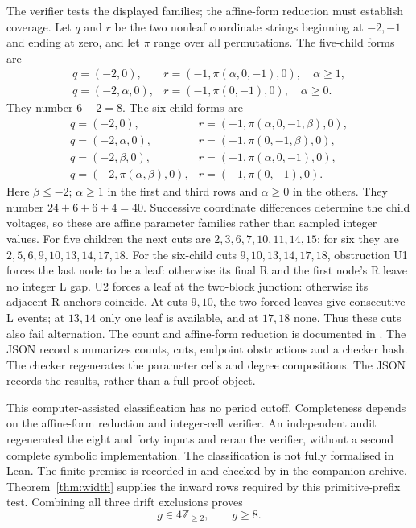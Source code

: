 \documentclass[11pt,letterpaper]{article}
\newcommand{\Z}{\mathbb Z}
\begin{document}
The verifier tests the displayed families; the affine-form reduction
must establish coverage. Let $q$ and $r$ be the two
nonleaf coordinate strings beginning at $-2,-1$ and ending at zero,
and let $\pi$ range over all permutations. The five-child forms are
\[
\begin{array}{ll}
q=(-2,0),&r=(-1,\pi(\alpha,0,-1),0),\quad\alpha\ge1,\\
q=(-2,\alpha,0),&r=(-1,\pi(0,-1),0),\quad\alpha\ge0.
\end{array}
\]
They number $6+2=8$. The six-child forms are
\[
\begin{array}{ll}
q=(-2,0),&r=(-1,\pi(\alpha,0,-1,\beta),0),\\
q=(-2,\alpha,0),&r=(-1,\pi(0,-1,\beta),0),\\
q=(-2,\beta,0),&r=(-1,\pi(\alpha,0,-1),0),\\
q=(-2,\pi(\alpha,\beta),0),&r=(-1,\pi(0,-1),0).
\end{array}
\]
Here $\beta\le-2$; $\alpha\ge1$ in the first and third rows and
$\alpha\ge0$ in the others. They number $24+6+6+4=40$.
Successive coordinate differences determine the child voltages, so these
are affine parameter families rather than sampled integer values.
For five children the next cuts are $2,3,6,7,10,11,14,15$;
for six they are $2,5,6,9,10,13,14,17,18$.
For the six-child cuts $9,10,13,14,17,18$, obstruction U1 forces
the last node to be a leaf: otherwise its final R and the first node's R
leave no integer L gap. U2 forces a leaf at the two-block junction:
otherwise its adjacent R anchors coincide. At cuts $9,10$, the two
forced leaves give consecutive L events; at $13,14$ only one leaf is
available, and at $17,18$ none. Thus these cuts also fail alternation.
The count and affine-form reduction is documented in
 \cite{Repo}.
The JSON record summarizes counts, cuts, endpoint obstructions and a
checker hash. The checker regenerates the parameter cells and degree compositions.
The JSON records the results, rather than a full proof object.

This computer-assisted classification has no period cutoff. Completeness
depends on the affine-form reduction and integer-cell verifier. An
independent audit regenerated the eight and forty inputs and reran the
verifier, without a second complete symbolic implementation. The
classification is not fully formalised in Lean. The finite premise is recorded in
 and checked by
 in the companion archive. Theorem~\ref{thm:width} supplies the inward
rows required by this primitive-prefix test. Combining
all three drift exclusions proves
\[
\boxed{g\in4\Z_{\ge2},\qquad g\ge8.}
\]
\end{document}
